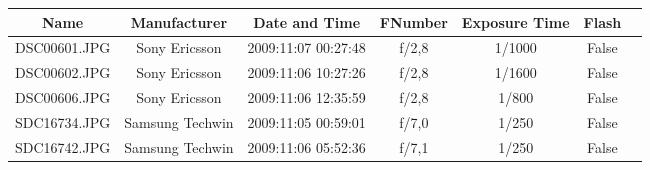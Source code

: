 \resizebox{13 cm}{!} {
\begin{tabular}{|c|c|c|c|c|c|c|}
\hline  Name & Manufacturer & Date and Time & FNumber & Exposure Time & Flash \\ 
\hline  DSC00601.JPG & Sony Ericsson   & 2009:11:07 00:27:48  & f/2,8 & 1/1000 & False\\ 
\hline  DSC00602.JPG & Sony Ericsson & 2009:11:06 10:27:26 & f/2,8  & 1/1600 & False \\ 
\hline  DSC00606.JPG & Sony Ericsson & 2009:11:06 12:35:59 & f/2,8  & 1/800 & False \\ 
\hline  SDC16734.JPG & Samsung Techwin & 2009:11:05 00:59:01   & f/7,0 & 1/250 & False\\ 
\hline  SDC16742.JPG & Samsung Techwin & 2009:11:06 05:52:36   & f/7,1 & 1/250 & False\\ 
\hline 
\end{tabular} 

}